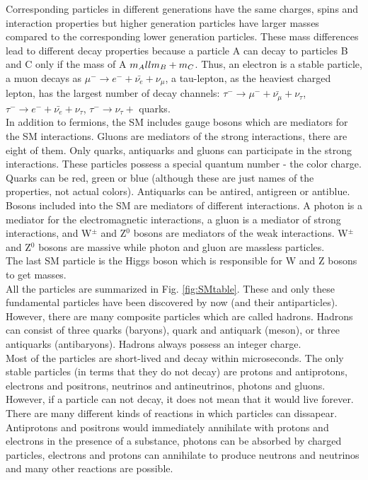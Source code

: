 Corresponding particles in different generations have the same charges, spins and interaction properties but higher generation particles have larger masses compared to the corresponding lower generation particles. These mass differences lead to different decay properties because a particle A can decay to particles B and C only if the mass of A $m_A \\ll m_B + m_C$. Thus, an electron is a stable particle, a muon decays as $\mu^- \rightarrow e^- + \bar{\nu_e} + \nu_\mu$, a tau-lepton, as the heaviest charged lepton, has the largest number of decay channels: $\tau^- \rightarrow \mu^- + \bar{\nu_\mu} + \nu_\tau$, $\tau^- \rightarrow e^- + \bar{\nu_e} + \nu_\tau$,  $\tau^- \rightarrow \nu_\tau +$ quarks. \\

In addition to fermions, the SM includes gauge bosons which are mediators for the SM interactions. Gluons are mediators of the strong interactions, there are eight of them. Only quarks, antiquarks and gluons can participate in the strong interactions. These particles possess a special quantum number - the color charge. Quarks can be red, green or blue (although these are just names of the properties, not actual colors). Antiquarks can be antired, antigreen or antiblue. \\

Bosons included into the SM are mediators of different interactions. A photon is a mediator for the electromagnetic interactions,  a gluon is a mediator of strong interactions, and W$^{\pm}$ and Z$^0$ bosons are mediators of the weak interactions. W$^{\pm}$ and Z$^0$ bosons are massive while photon and gluon are massless particles. \\

The last SM particle is the Higgs boson which is responsible for W and Z bosons to get masses.\\

All the particles are summarized in Fig. \ref{fig:SMtable}. These and only these fundamental particles have been discovered by now (and their antiparticles). However, there are many composite particles which are called hadrons. Hadrons can consist of three quarks (baryons), quark and antiquark (meson), or three antiquarks (antibaryons). Hadrons always possess an integer charge.\\

Most of the particles are short-lived and decay within microseconds. The only stable particles (in terms that they do not decay) are protons and antiprotons, electrons and positrons, neutrinos and antineutrinos, photons and gluons. However, if a particle can not decay, it does not mean that it would live forever. There are many different kinds of reactions in which particles can dissapear. Antiprotons and positrons would immediately annihilate with protons and electrons in the presence of a substance, photons can be absorbed by charged particles, electrons and protons can annihilate to produce neutrons and neutrinos and many other reactions are possible.\\ 

